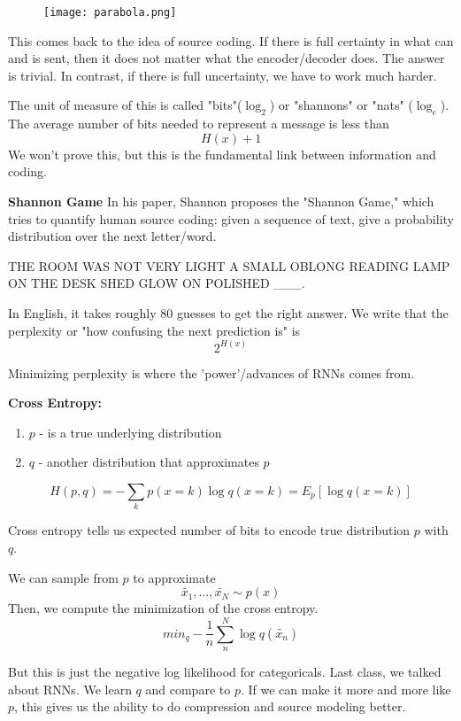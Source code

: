\documentclass{article}
\begin{document}
\begin{figure}[h!]
\centering
\texttt{[image: parabola.png]}
\label{fig:univerise}
\end{figure}

\pagebreak
\smallskip
This comes back to the idea of source coding. If there is full certainty in what can and is sent, then it does not matter what the encoder/decoder does. The answer is trivial. In contrast, if there is full uncertainty, we have to work much harder.

\smallskip
The unit of measure of this is called "bits"($\log_2$) or "shannons" or "nats" ($\log_e$). The average number of bits needed to represent a message is less than $$H(x) + 1$$ We won't prove this, but this is the fundamental link between information and coding.

\smallskip
\smallskip
\textbf{Shannon Game}
In his paper, Shannon proposes the "Shannon Game," which tries to quantify human source coding: given a sequence of text, give a probability distribution over the next letter/word.

\smallskip
THE ROOM WAS NOT VERY LIGHT A SMALL OBLONG READING LAMP ON THE DESK SHED GLOW ON POLISHED \_\_\_.

\smallskip
\smallskip
In English, it takes roughly 80 guesses to get the right answer. We write that the perplexity or "how confusing the next prediction is" is
$$2^{H(x)}$$

Minimizing perplexity is where the 'power'/advances of RNNs comes from.

\smallskip
\textbf{Cross Entropy:}

\begin{enumerate}
\item $p$ - is a true underlying distribution
\item $q$ - another distribution that approximates $p$
\end{enumerate}

$$H(p, q) = - \sum_k p(x=k) \log q(x=k) = E_p[\log q(x=k)]$$

Cross entropy tells us expected number of bits to encode true distribution $p$ with $q$.

\smallskip
We can sample from $p$ to approximate
$$\tilde{x_1}, \ldots, \tilde{x_N} \sim p(x)$$
Then, we compute the minimization of the cross entropy.
$$min_q - \frac{1}{n} \sum_{n}^N \log q(\tilde{x_n})$$

\smallskip
But this is just the negative log likelihood for categoricals. Last class, we talked about RNNs. We learn $q$ and compare to $p$. If we can make it more and more like $p$, this gives us the ability to do compression and source modeling better.
\end{document}
